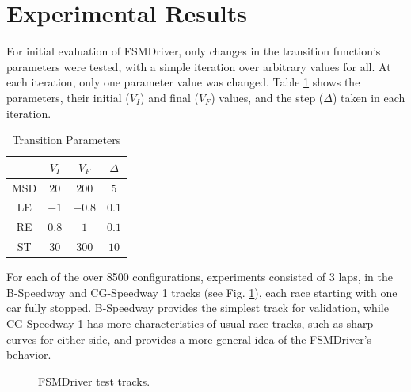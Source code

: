 \section{Experimental Results}\label{sec:results}
For initial evaluation of FSMDriver, only changes in the transition function's 
parameters were tested, with a simple iteration over arbitrary values for all. At
each iteration, only one parameter value was changed. Table \ref{tbl:parameters} shows the parameters, their initial ($V_I$) and final 
($V_F$) values, and the step ($\Delta$) taken in each iteration. 

\begin{table}[h]
\renewcommand{\arraystretch}{1.3}
\caption{Transition Parameters}
\label{tbl:parameters}
\centering
\begin{tabular}{c||c||c||c}
\hline \bfseries &\bfseries $V_I$ &\bfseries $V_F$ &\bfseries $\Delta$ \\
\hline
\hline MSD & $20$ & $200$ & $5$ \\ 
\hline LE & $-1$ & $-0.8$ & $0.1$ \\ 
\hline RE & $0.8$ & $1$ & $0.1$ \\ 
\hline ST & $30$ & $300$ & $10$ \\ 
\hline 
\end{tabular} 
\end{table}

For each of the over 8500 configurations, experiments consisted of 3 laps, in 
the B-Speedway and CG-Speedway 1 tracks (see Fig. \ref{fig:tracks}), each race 
starting with one car fully stopped. B-Speedway provides the simplest track for 
validation, while CG-Speedway 1 has more characteristics of usual race tracks, 
such as sharp curves for either side, and provides a more general idea of the 
FSMDriver's behavior.

\begin{figure}
\centering 
{}
\hfill
{}
\caption{FSMDriver test tracks.} 
\label{fig:tracks} 
\end{figure} 

